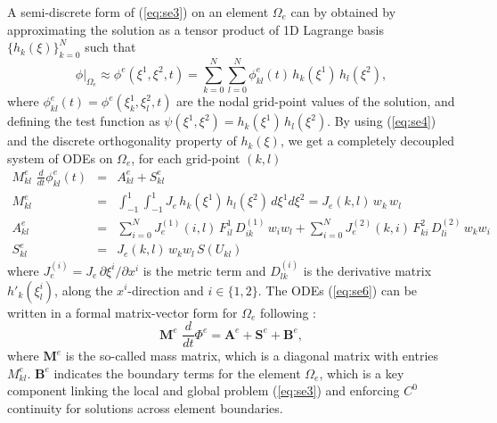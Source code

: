 \documentclass{agujournal}
\begin{document}
{  A semi-discrete  form of  (\ref{eq:se3})  on an  element $\Omega_e$ can by obtained by
   approximating the solution  as a tensor product of  1D Lagrange basis  $\{ h_k(\xi)\}_{k=0}^N$ such that
 \begin{equation}
     \phi |_{\Omega_e} \approx  \phi^e(\xi^1,\xi^2,t) =  
              \sum_{k=0}^{N}   \sum_{l=0}^{N}  \phi^e_{kl}(t)  \, h_k(\xi^1) \, h_l(\xi^2),  \label{eq:se60}
 \end{equation}
 where $\phi^e_{kl}(t) = \phi^e(\xi_k^1, \xi_l^2,t) $ are  the nodal grid-point values of the solution, and  defining the  test function as
  $\psi(\xi^1,\xi^2) = h_k(\xi^1) \, h_l(\xi^2)$. By using (\ref{eq:se4}) and the discrete orthogonality property of $h_k(\xi)$, 
  we get a completely decoupled system of ODEs on  $\Omega_e$,  for each grid-point $(k,l)$ 
  \begin{eqnarray}
      M^e_{kl}\, \, \frac{d }{dt} \phi^e_{kl}(t) &= &  A^e_{kl}    + S^e_{kl}  \label{eq:se6} \\
        M^e_{kl}  &=  & \int_{-1}^{1} \int_{-1}^{1} J_e  \, h_k(\xi^1)  \, h_l(\xi^2) \, d\xi^1  d\xi^2 = J_e(k,l) \, w_k \, w_l \\
          A^e_{kl}  &=  & \sum_{i=0}^N  J^{(1)}_e(i,l) \,  F^1_{i l} \, D_{ik}^{(1)}\, w_i  w_l  +
           \sum_{i=0}^N  J^{(2)}_e(k, i) \,  F^2_{k i} \, D_{l i}^{(2)} \, w_k  w_i \\
           S^e_{kl}  &=   &J_e(k,l) \, w_k w_l  \, S(U_{kl})
  \end{eqnarray}  
   where $J^{(i)}_e = J_e \,\partial \xi^i / \partial x^i$ is the metric term  and 
   $D^{(i)}_{lk}$ is the  derivative matrix $h'_k(\xi^i_l)$, 
  along the $x^i$-direction and  $ i \in \{1,  2\}$.  The ODEs  (\ref{eq:se6}) can be written in a formal matrix-vector form
  for  $\Omega_e$  following
  \cite{KS2013book}: 
 \begin{equation}
    \mathbf{M}^e\, \, \frac{d }{dt} \Phi^e =   \mathbf{A}^e    + \mathbf{S}^e + \mathbf{B}^e,  \label{eq:se7} 
 \end{equation}
      where $\mathbf{M}^e$ is the  so-called mass matrix,  which  is a diagonal  matrix with entries $M^e_{kl}$.    $\mathbf{B}^e$
  indicates the boundary terms for the element 
  $\Omega_e$, which is a key component linking  the local and global problem (\ref{eq:se3}) and enforcing $C^0$ continuity
  for solutions across element boundaries.  
  
}
\end{document}
